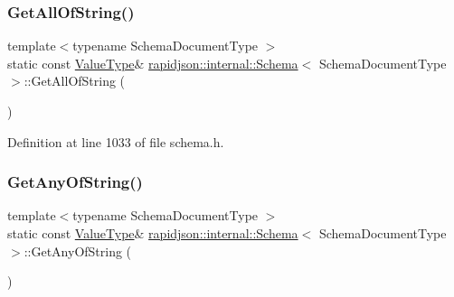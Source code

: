 \subsubsection{\texorpdfstring{GetAllOfString()}{GetAllOfString()}}
{\footnotesize\ttfamily template$<$typename Schema\+Document\+Type $>$ \\
static const \mbox{\hyperlink{classrapidjson_1_1internal_1_1_schema_a3979a9083c598195927c08c6e3ba91d1}{Value\+Type}}\& \mbox{\hyperlink{classrapidjson_1_1internal_1_1_schema}{rapidjson\+::internal\+::\+Schema}}$<$ Schema\+Document\+Type $>$\+::Get\+All\+Of\+String (\begin{DoxyParamCaption}{ }\end{DoxyParamCaption})\hspace{0.3cm}{\ttfamily [static]}}



Definition at line 1033 of file schema.\+h.


\begin{DoxyCode}{0}

\end{DoxyCode}
\mbox{\label{classrapidjson_1_1internal_1_1_schema_afe40efb889b03e5ca9ce17e963cd4967}} 
\subsubsection{\texorpdfstring{GetAnyOfString()}{GetAnyOfString()}}
{\footnotesize\ttfamily template$<$typename Schema\+Document\+Type $>$ \\
static const \mbox{\hyperlink{classrapidjson_1_1internal_1_1_schema_a3979a9083c598195927c08c6e3ba91d1}{Value\+Type}}\& \mbox{\hyperlink{classrapidjson_1_1internal_1_1_schema}{rapidjson\+::internal\+::\+Schema}}$<$ Schema\+Document\+Type $>$\+::Get\+Any\+Of\+String (\begin{DoxyParamCaption}{ }\end{DoxyParamCaption})\hspace{0.3cm}{\ttfamily [static]}}



